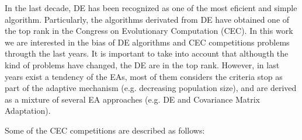 In the last decade, DE has been recognized as one of the most eficient and simple algorithm.
%
Particularly, the algorithms derivated from DE have obtained one of the top rank in the Congress on Evolutionary Computation (CEC).
%
In this work we are interested in the bias of DE algorithms and CEC competitions problems througth the last years.
%
It is important to take into account that althougth the kind of problems have changed, the DE are in the top rank.
%
However, in last years exist a tendency of the EAs, most of them considers the criteria stop as part of the adaptive mechanism (e.g. decreasing population size), and are derived as a mixture of several EA approaches (e.g. DE and Covariance Matrix Adaptation).
%

Some of the CEC competitions are described as follows:
